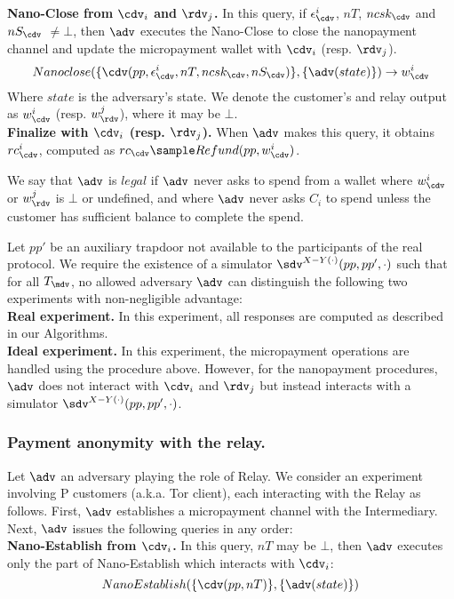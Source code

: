 \textbf{Nano-Close from $\cdv_i$ and $\rdv_j$.} In this query, if $\epsilon^i_\cdv$, $nT$, $ncsk_\cdv$ and $nS_\cdv$ $\neq \bot$, then $\adv$ executes the Nano-Close to close the nanopayment channel and update the micropayment wallet with $\cdv_i$ (resp. $\rdv_j$).
$$Nano\-close(\{\cdv(pp, \epsilon^i_\cdv, nT, ncsk_\cdv, nS_\cdv)\}, \{\adv(state)\}) \rightarrow w^i_\cdv$$
Where $state$ is the adversary's state. We denote the customer's and relay output as $w^i_\cdv$ (resp. $w^j_\rdv$), where it may be $\bot$.\\

\textbf{Finalize with $\cdv_i$ (resp. $\rdv_j$).} When $\adv$ makes this query, it obtains $rc^i_\cdv$, computed as $rc_\cdv \sample Refund(pp, w^i_\cdv)$.

We say that $\adv$ is $legal$ if $\adv$ never asks to spend from a wallet where $w^i_\cdv$ or $w^j_\rdv$ is $\bot$ or undefined, and where $\adv$ never asks $C_i$ to spend unless the customer has sufficient balance to complete the spend.

Let $pp'$ be an auxiliary trapdoor not available to the participants of the real protocol. We require the existence of a simulator $\sdv^{X-Y(\cdot)}(pp, pp', \cdot)$ such that for all $T_\mdv$, no allowed adversary $\adv$ can distinguish the following two experiments with non-negligible advantage:\\
\textbf{Real experiment.} In this experiment, all responses are computed as described in our Algorithms.\\
\textbf{Ideal experiment.} In this experiment, the micropayment operations are handled using the procedure above. However, for the nanopayment procedures, $\adv$ does not interact with $\cdv_i$ and $\rdv_j$ but instead interacts with a simulator $\sdv^{X-Y(\cdot)}(pp,pp',\cdot)$.

\subsubsection{Payment anonymity with the relay.}
\label{def:anon2}

Let $\adv$ an adversary playing the role of Relay. We consider an experiment involving P customers (a.k.a. Tor client), each interacting with the Relay as follows. First, $\adv$ establishes a micropayment channel with the Intermediary. Next, $\adv$ issues the following queries in any order:\\

\textbf{Nano-Establish from $\cdv_i$.} In this query, $nT$ may be $\bot$, then $\adv$ executes only the part of Nano-Establish which interacts with $\cdv_i$:
$$Nano\-Establish(\{\cdv(pp, nT)\}, \{\adv(state)\})$$

